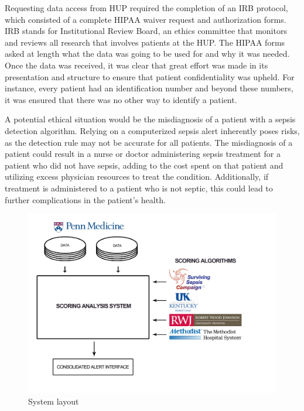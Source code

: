 \documentclass{sig-alternate}
\begin{document}
Requesting data access from HUP required the completion of an IRB protocol, which consisted of a complete HIPAA waiver request and authorization forms. IRB stands for Institutional Review Board, an ethics committee that monitors and reviews all research that involves patients at the HUP. The HIPAA forms asked at length what the data was going to be used for and why it was needed. Once the data was received, it was clear that great effort was made in its presentation and structure to ensure that patient confidentiality was upheld. For instance, every patient had an identification number and beyond these numbers, it was ensured that there was no other way to identify a patient. 

A potential ethical situation would be the misdiagnosis of a patient with a sepsis detection algorithm.  Relying on a computerized sepsis alert inherently poses risks, as the detection rule may not be accurate for all patients. The misdiagnosis of a patient could result in a nurse or doctor administering sepsis treatment for a patient who did not have sepsis, adding to the cost spent on that patient and utilizing excess physician resources to treat the condition. Additionally, if treatment is administered to a patient who is not septic, this could lead to further complications in the patient's health.  

\begin{figure}
	\begin{center}
		\includegraphics[width=1.0\linewidth]{FlowChart.png}
	\end{center}
	\caption{System layout}
	\label{fig:layout}
\end{figure}
\end{document}
